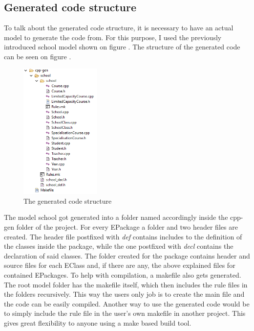 \subsection{Generated code structure}\label{sect:GeneratedCodeStructure}

To talk about the generated code structure, it is necessary to have an actual
model to generate the code from. For this purpose, I used the previously
introduced school model shown on figure . The structure
of the generated code can be seen on figure .

\begin{figure}[!ht]
\centering
\includegraphics[width=40mm, keepaspectratio]{figures/gen_code_struct.png}
\caption{The generated code structure}
\label{fig:GenCodeStruct}
\end{figure}

The model school got generated into a folder named accordingly inside the
cpp-gen folder of the project. For every EPackage  a folder and two header files
are created. The header file postfixed with \emph{def} contains includes to
the definition of the classes inside the package, while the one postfixed with
\emph{decl} contains the declaration of said classes. The folder created for the
package contains header and source files for each EClass and, if there are any,
the above explained files for contained EPackages. To help with compilation, a
makefile also gets generated. The root model folder has the makefile itself,
which then includes the rule files in the folders recursively. This way the
users only job is to create the main file and the code can be easily compiled.
Another way to use the generated code would be to simply include the rule file
in the user's own makefile in another project. This gives great flexibility to
anyone using a make based build tool.

